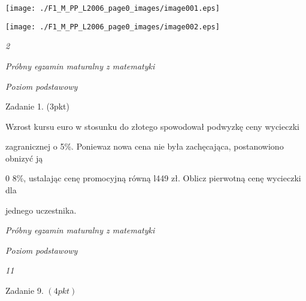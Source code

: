 \documentclass[a4paper,12pt]{article}
\begin{document}
\begin{center}
\begin{tabular}{l|l}
wodzenia'$}	\end{array}$}&	\multicolumn{1}{|l}{$\begin{array}{l}\mbox{LISTOPAD}	\\	\mbox{ROK 2006}	\\	\mbox{Za rozwiązanie}	\\	\mbox{wszystkich zadań}	\\	\mbox{mozna otrzymać}	\\	\mbox{łącznie}	\\	\mbox{50 punktów}	\end{array}$}	\\
\hline
\multicolumn{1}{l|}{$\begin{array}{l}\mbox{Wypelnia zdający przed}	\\	\mbox{roz oczęciem racy}	\\	\mbox{PESEL ZDAJACEGO}	\end{array}$}&	\multicolumn{1}{|l}{$\begin{array}{l}\mbox{KOD}	\\	\mbox{ZDAJACEGO}	\end{array}$}
\end{tabular}


\texttt{[image: ./F1\_M\_PP\_L2006\_page0\_images/image001.eps]}

\texttt{[image: ./F1\_M\_PP\_L2006\_page0\_images/image002.eps]}
\end{center}



{\it 2}

{\it Próbny egzamin maturalny z matematyki}

{\it Poziom podstawowy}

Zadanie 1. (3pkt)

Wzrost kursu euro w stosunku do złotego spowodował podwyzkę ceny wycieczki

zagranicznej o 5\%. Poniewaz nowa cena nie była zachęcająca, postanowiono obnizyć ją

0 8\%, ustalając cenę promocyjną równą l449 zł. Oblicz pierwotną cenę wycieczki dla

jednego uczestnika.





{\it Próbny egzamin maturalny z matematyki}

{\it Poziom podstawowy}

{\it 11}

Zadanie 9. $(4pkt)$
\end{document}
